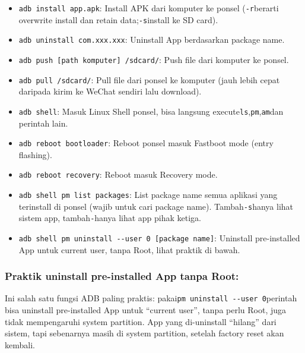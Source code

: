 \begin{itemize}
  \item \texttt{adb install app.\allowbreak apk}: Install APK dari komputer ke ponsel (\texttt{-\allowbreak r}berarti overwrite install dan retain data;\texttt{-\allowbreak s}install ke SD card).
  \item \texttt{adb uninstall com.\allowbreak xxx.\allowbreak xxx}: Uninstall App berdasarkan package name.
  \item \texttt{adb push [path komputer] /\allowbreak sdcard/}: Push file dari komputer ke ponsel.
  \item \texttt{adb pull /\allowbreak sdcard/}: Pull file dari ponsel ke komputer (jauh lebih cepat daripada kirim ke WeChat sendiri lalu download).
  \item \texttt{adb shell}: Masuk Linux Shell ponsel, bisa langsung execute\texttt{ls},\texttt{pm},\texttt{am}dan perintah lain.
  \item \texttt{adb reboot bootloader}: Reboot ponsel masuk Fastboot mode (entry flashing).
  \item \texttt{adb reboot recovery}: Reboot masuk Recovery mode.
  \item \texttt{adb shell pm list packages}: List package name semua aplikasi yang terinstall di ponsel (wajib untuk cari package name). Tambah\texttt{-\allowbreak s}hanya lihat sistem app, tambah\texttt{-}hanya lihat app pihak ketiga.
  \item \texttt{adb shell pm uninstall -\allowbreak -\allowbreak user 0 [package name]}: Uninstall pre-installed App untuk current user, tanpa Root, lihat praktik di bawah.
\end{itemize}

\subsubsection*{Praktik uninstall pre-installed App tanpa Root:}

Ini salah satu fungsi ADB paling praktis: pakai\texttt{pm uninstall -\allowbreak -\allowbreak user 0}perintah bisa uninstall pre-installed App untuk “current user”, tanpa perlu Root, juga tidak mempengaruhi system partition. App yang di-uninstall “hilang” dari sistem, tapi sebenarnya masih di system partition, setelah factory reset akan kembali.

